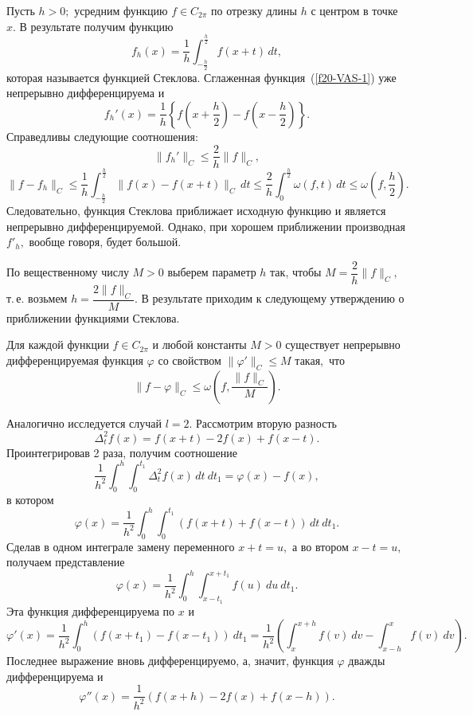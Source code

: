  Пусть $h>0;$ усредним функцию $f{\in C_{2\pi}}$ по отрезку
 длины $h$ с центром в точке $x.$  В результате получим функцию
    \begin{equation}\label{f20-VAS-1}
  f_h(x)=\frac{1}{h}
 \int_{-\frac{h}{2}}^{\frac{h}{2}} f(x+t)\, dt,
\end{equation}
 которая называется  функцией Стеклова. Сглаженная функция~(\ref{f20-VAS-1})
 уже непрерывно дифференцируема и
 $$
 f_h'(x)=\frac{1}{h} \left\{ f\left( x+\frac{h}{2}\right)-f\left(
 x-\frac{h}{2}\right)\right\}.
 $$
 Справедливы следующие соотношения:
 $$
 \|f_h'\|_C\le \frac{2}{h}\|f\|_C,
 $$
 $$
 \|f-f_h\|_C\le \frac{1}{h}
 \int_{-\frac{{h}}{2}}^{\frac{{h}}{2}} \| f(x)-f(x+t)\|_C\, dt\le
 \frac{2}{h}
 \int_{0}^{\frac{h}{2}} \omega(f,t)\, dt\le \omega\left(
 f,\frac{h}{2}\right).
 $$
 Следовательно, функция Стеклова приближает исходную функцию и является непрерывно
 дифференцируемой. Однако, при хорошем приближении производная $f'_h,$ вообще говоря,
 будет большой.

 По вещественному числу $M>0$ выберем параметр $h$ так, чтобы $M=\dfrac{2}{h}\|f\|_C,$
 т.\,е. возьмем $h=\dfrac{2\|f\|_C}{M}.$ В результате приходим к следующему утверждению о приближении функциями Стеклова.

 \begin{teo} Для каждой функции $f\in C_{{2\pi}}$ и любой константы $M>0$ существует
 непрерывно дифференцируемая функция $\varphi$ со свойством
 $\|\varphi'\|_C\le M$ такая,~что
 $$
  \|f-\varphi\|_C\le \omega\left( f,\frac{\|f\|_C}{M}\right).
 $$
 \end{teo}

 Аналогично исследуется случай $l=2.$
Рассмотрим вторую разность
   $$
 \Delta_t^2 f(x)=f(x+t)-2f(x)+f(x-t).
 $$
 Проинтегрировав 2 раза, получим соотношение
  \begin{equation}\label{f20-5}
 \frac{1}{h^2}\int_0^{h}\int_0^{t_1} \Delta_t^2 f(x)\, dt\
 dt_1=\varphi(x)-f(x),
 \end{equation}
 в котором
  \begin{equation}\label{f20-5a}
 \varphi(x)=\frac{1}{h^2}\int_0^{h}\int_0^{t_1} (f(x+t)+f(x-t))\, dt\
 dt_1.
  \end{equation}
 Сделав в одном интеграле замену переменного $x+t=u,$ а во втором $x-t=u,$ получаем представление
 $$
 \varphi(x)=\frac{1}{h^2}\int_0^{h}\int_{x-t_1}^{x+t_1} f(u)\ du\  dt_1.
 $$
 Эта функция дифференцируема по $x$ и
 $$
 \varphi'(x)=\frac{1}{h^2}\int_0^{h}(f(x+t_1)-f(x-t_1))\  dt_1=\frac{1}{h^2}\left(\int_x^{x+h}f(v)\ dv-\int_{x-h}^{x}f(v)\ dv\right).
 $$
Последнее выражение вновь дифференцируемо, а, значит, функция $\varphi$ дважды
дифференцируема и
 \begin{equation}\label{f20-6}
 \varphi''(x)=\frac{1}{h^2}\left(f(x+h)-2f(x)+f(x-h)\right).
\end{equation}

